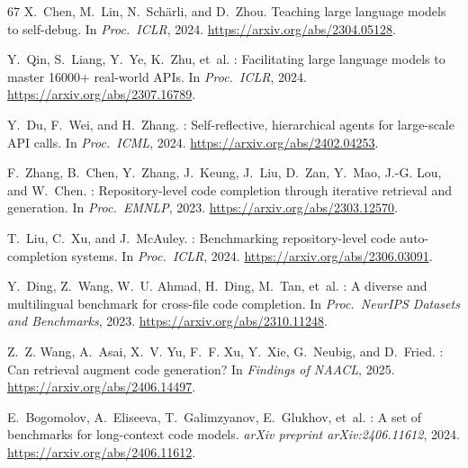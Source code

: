 \documentclass[11pt,a4paper]{article}
\begin{document}
\begin{thebibliography}{67}
X.~Chen, M.~Lin, N.~Sch{\"a}rli, and D.~Zhou.
\newblock Teaching large language models to self-debug.
\newblock In \emph{Proc.\ ICLR}, 2024.
\newblock \url{https://arxiv.org/abs/2304.05128}.


Y.~Qin, S.~Liang, Y.~Ye, K.~Zhu, et~al.
: Facilitating large language models to master 16000+ real-world {API}s.
\newblock In \emph{Proc.\ ICLR}, 2024.
\newblock \url{https://arxiv.org/abs/2307.16789}.

Y.~Du, F.~Wei, and H.~Zhang.
: Self-reflective, hierarchical agents for large-scale {API} calls.
\newblock In \emph{Proc.\ ICML}, 2024.
\newblock \url{https://arxiv.org/abs/2402.04253}.


F.~Zhang, B.~Chen, Y.~Zhang, J.~Keung, J.~Liu, D.~Zan, Y.~Mao, J.-G. Lou, and W.~Chen.
: Repository-level code completion through iterative retrieval and generation.
\newblock In \emph{Proc.\ EMNLP}, 2023.
\newblock \url{https://arxiv.org/abs/2303.12570}.

T.~Liu, C.~Xu, and J.~McAuley.
: Benchmarking repository-level code auto-completion systems.
\newblock In \emph{Proc.\ ICLR}, 2024.
\newblock \url{https://arxiv.org/abs/2306.03091}.

Y.~Ding, Z.~Wang, W.~U. Ahmad, H.~Ding, M.~Tan, et~al.
: A diverse and multilingual benchmark for cross-file code completion.
\newblock In \emph{Proc.\ NeurIPS Datasets and Benchmarks}, 2023.
\newblock \url{https://arxiv.org/abs/2310.11248}.

Z.~Z. Wang, A.~Asai, X.~V. Yu, F.~F. Xu, Y.~Xie, G.~Neubig, and D.~Fried.
: Can retrieval augment code generation?
\newblock In \emph{Findings of NAACL}, 2025.
\newblock \url{https://arxiv.org/abs/2406.14497}.

E.~Bogomolov, A.~Eliseeva, T.~Galimzyanov, E.~Glukhov, et~al.
: A set of benchmarks for long-context code models.
\newblock \emph{arXiv preprint arXiv:2406.11612}, 2024.
\newblock \url{https://arxiv.org/abs/2406.11612}.


\end{thebibliography}
\end{document}
